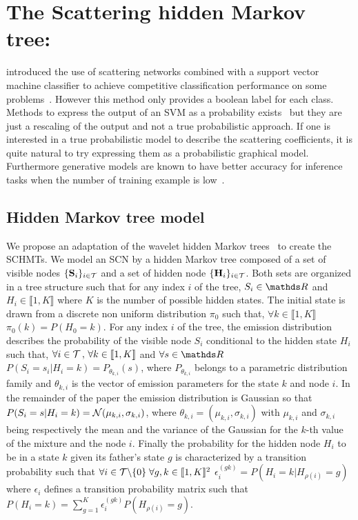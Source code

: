\documentclass{article}
\begin{document}

\section{The Scattering hidden Markov tree:}
\label{sec:SCHMT}

  \citep{Mallat ST} introduced the use of scattering networks combined with a support vector machine classifier to achieve competitive classification performance on some problems~\citep{bruna}. However this method only provides a boolean label for each class. Methods to express the output of an SVM as a probability exists~\citep{platt1999probabilistic} but they are just a rescaling of the output and not a true probabilistic approach. If one is interested in a true probabilistic model to describe the scattering coefficients, it is quite natural to try expressing them as a probabilistic graphical model. Furthermore generative models are known to have better accuracy for inference tasks when the number of training example is low~\citep{jordan2002discriminative}.
  
  \subsection{Hidden Markov tree model}
    \label{subsec:SCHMT/HMT model}
    We propose an adaptation of the wavelet hidden Markov trees~\citep{Crouse and Durand} to create the SCHMTs. We model an SCN by a hidden Markov tree composed of a set of visible nodes $\{{\bf S}_{i}\}_{i \in \mathcal{T}}$ and a set of hidden node $\{{\bf H}_{i}\}_{i \in \mathcal{T}}$. Both sets are organized in a tree structure such that for any index $i$ of the tree, $S_{i} \in \dsR$ and $H_{i} \in \llbracket 1,K \rrbracket$ where $K$ is the number of possible hidden states.
    The initial state is drawn from a discrete non uniform distribution $\pi_{0}$ such that, $\forall k \in \llbracket 1,K \rrbracket$ $\pi_{0}(k) = P(H_{0}=k)$.
    For any index $i$ of the tree, the emission distribution describes the probability of the visible node $S_{i}$ conditional to the hidden state $H_{i}$ such that, $\forall i \in \mathcal{T} \, ,\, \forall k \in \llbracket1,K\rrbracket$ and $\forall s \in \dsR$ $P(S_{i}=s_{i}|H_{i}=k) = P_{\theta_{k,i}}(s)$, where $P_{\theta_{k,i}}$ belongs to a parametric distribution family and $\theta_{k,i}$ is the vector of emission parameters for the state $k$ and node $i$. In the remainder of the paper the emission distribution is Gaussian so that $P(S_{i}=s | H_{i}=k) = \mathcal{N}(\mu_{k,i},\sigma_{k,i})$, where $\theta_{k,i}=(\mu_{k,i},\sigma_{k,i})$ with $\mu_{k,i}$ and $\sigma_{k,i}$ being respectively the mean and the variance of the Gaussian for the $k$-th value of the mixture and the node $i$.
    Finally the probability for the hidden node $H_{i}$ to be in a state $k$ given its father's state $g$ is characterized by a transition probability such that $\forall i \in \mathcal{T} \backslash \{ 0 \} \; \forall g,k \in \llbracket1,K\rrbracket^{2}$ $\epsilon_{i}^{(gk)} = P(H_{i}= k | H_{\rho(i)}=g)$ where $\epsilon_{i}$ defines a transition probability matrix such that $P(H_{i}=k) = \sum_{g=1}^{K} \epsilon_{i}^{(gk)} P(H_{\rho(i)}=g)$.
\end{document}
